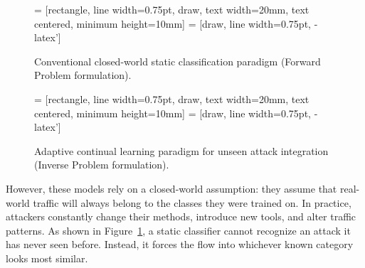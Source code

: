 \begin{figure}[htbp]
  \centering
   = [rectangle, line width=0.75pt, draw, text width=20mm, text centered, minimum height=10mm]
   = [draw, line width=0.75pt, -latex']
  \caption{Conventional closed-world static classification paradigm (Forward Problem formulation).}
  \label{fig:fp}
\end{figure}

\begin{figure}[htbp]
  \centering
   = [rectangle, line width=0.75pt, draw, text width=20mm, text centered, minimum height=10mm]
   = [draw, line width=0.75pt, -latex']
  \caption{Adaptive continual learning paradigm for unseen attack integration (Inverse Problem formulation).}
  \label{fig:ip}
\end{figure}

However, these models rely on a closed-world assumption: they assume that real-world traffic will always belong to the classes they were trained on. In practice, attackers constantly change their methods, introduce new tools, and alter traffic patterns. As shown in Figure~\ref{fig:fp}, a static classifier cannot recognize an attack it has never seen before. Instead, it forces the flow into whichever known category looks most similar.

